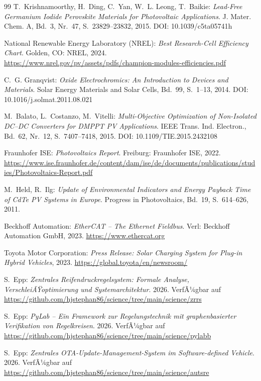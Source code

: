﻿\documentclass[a4paper,12pt]{article}
\theoremstyle{definition}
\theoremstyle{remark}
\begin{document}
\begin{thebibliography}{99}
T.~Krishnamoorthy, H.~Ding, C.~Yan, W.~L. Leong, T.~Baikie:
\textit{Lead-Free Germanium Iodide Perovskite Materials for Photovoltaic
Applications}.
J. Mater. Chem. A, Bd.~3, Nr.~47, S.~23829--23832, 2015.
DOI: 10.1039/c5ta05741h

National Renewable Energy Laboratory (NREL):
\textit{Best Research-Cell Efficiency Chart}.
Golden, CO: NREL, 2024.
\url{https://www.nrel.gov/pv/assets/pdfs/champion-modules-efficiencies.pdf}

C.~G. Granqvist:
\textit{Oxide Electrochromics: An Introduction to Devices and Materials}.
Solar Energy Materials and Solar Cells, Bd.~99, S.~1--13, 2014.
DOI: 10.1016/j.solmat.2011.08.021

M.~Balato, L.~Costanzo, M.~Vitelli:
\textit{Multi-Objective Optimization of Non-Isolated DC--DC Converters
for DMPPT PV Applications}.
IEEE Trans. Ind. Electron., Bd.~62, Nr.~12, S.~7407--7418, 2015.
DOI: 10.1109/TIE.2015.2432108

Fraunhofer ISE:
\textit{Photovoltaics Report}.
Freiburg: Fraunhofer ISE, 2022.
\url{https://www.ise.fraunhofer.de/content/dam/ise/de/documents/publications/studies/Photovoltaics-Report.pdf}

M.~Held, R.~Ilg:
\textit{Update of Environmental Indicators and Energy Payback Time
of CdTe PV Systems in Europe}.
Progress in Photovoltaics, Bd.~19, S.~614--626, 2011.

Beckhoff Automation:
\textit{EtherCAT -- The Ethernet Fieldbus}.
Verl: Beckhoff Automation GmbH, 2023.
\url{https://www.ethercat.org}

Toyota Motor Corporation:
\textit{Press Release: Solar Charging System for Plug-in Hybrid Vehicles},
2023. \url{https://global.toyota/en/newsroom/}

S.~Epp:
\textit{Zentrales Reifendruckregelsystem: Formale Analyse, VerschleiÃŸoptimierung und Systemarchitektur}. 2026. VerfÃ¼gbar auf \url{https://github.com/hjstephan86/science/tree/main/science/zrrs}

S.~Epp:
\textit{PyLab -- Ein Framework zur Regelungstechnik mit graphenbasierter Verifikation von Regelkreisen}. 2026. VerfÃ¼gbar auf \url{https://github.com/hjstephan86/science/tree/main/science/pylabb}

S.~Epp:
\textit{Zentrales OTA-Update-Management-System im Software-defined Vehicle}. 2026. VerfÃ¼gbar auf \url{https://github.com/hjstephan86/science/tree/main/science/autsre}



\end{thebibliography}
\end{document}
